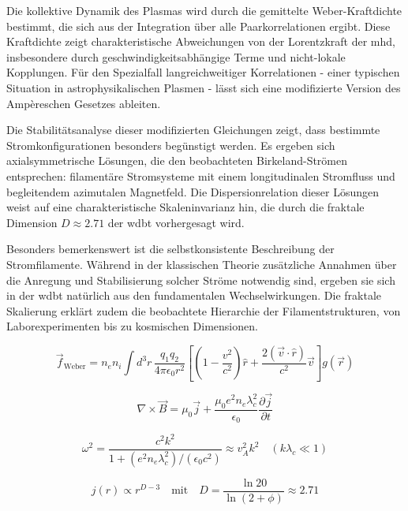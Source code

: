 Die kollektive Dynamik des Plasmas wird durch die gemittelte Weber-Kraftdichte bestimmt, die sich aus der Integration über alle Paarkorrelationen ergibt. Diese Kraftdichte zeigt
charakteristische Abweichungen von der Lorentzkraft der \gls{mhd}, insbesondere durch geschwindigkeitsabhängige Terme und nicht-lokale Kopplungen. Für den Spezialfall
langreichweitiger Korrelationen - einer typischen Situation in astrophysikalischen Plasmen - lässt sich eine modifizierte Version des Ampèreschen Gesetzes ableiten.

Die Stabilitätsanalyse dieser modifizierten Gleichungen zeigt, dass bestimmte Stromkonfigurationen besonders begünstigt werden. Es ergeben sich axialsymmetrische Lösungen, die
den beobachteten Birkeland-Strömen entsprechen: filamentäre Stromsysteme mit einem longitudinalen Stromfluss und begleitendem azimutalen Magnetfeld. Die Dispersionrelation dieser
Lösungen weist auf eine charakteristische Skaleninvarianz hin, die durch die fraktale Dimension $D \approx 2.71$ der \gls{wdbt} vorhergesagt wird.

Besonders bemerkenswert ist die selbstkonsistente Beschreibung der Stromfilamente. Während in der klassischen Theorie zusätzliche Annahmen über die Anregung und Stabilisierung
solcher Ströme notwendig sind, ergeben sie sich in der \gls{wdbt} natürlich aus den fundamentalen Wechselwirkungen. Die fraktale Skalierung erklärt zudem die beobachtete Hierarchie
der Filamentstrukturen, von Laborexperimenten bis zu kosmischen Dimensionen.

\begin{equation}
\vec{f}_{\text{Weber}} = n_e n_i \int d^3r \, \frac{q_1 q_2}{4\pi\epsilon_0 r^2} 
\left[ \left(1 - \frac{v^2}{c^2}\right)\hat{r} + \frac{2(\vec{v}\cdot\hat{r})}{c^2}\vec{v} \right] g(\vec{r})
\end{equation}

\begin{equation}
\nabla \times \vec{B} = \mu_0 \vec{j} + \frac{\mu_0 e^2 n_e \lambda_c^2}{\epsilon_0} \frac{\partial \vec{j}}{\partial t}
\end{equation}

\begin{equation}
\omega^2 = \frac{c^2 k^2}{1 + (e^2 n_e \lambda_c^2)/(\epsilon_0 c^2)} \approx v_A^2 k^2 \quad (k\lambda_c \ll 1)
\end{equation}

\begin{equation}
j(r) \propto r^{D-3} \quad \text{mit} \quad D = \frac{\ln 20}{\ln(2+\phi)} \approx 2.71
\end{equation}


